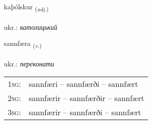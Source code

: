 \documentclass[frontgrid, backgrid]{flacards}\usepackage[]{graphicx}\usepackage[]{xcolor}
\begin{document}
\renewcommand{\blhead}{\vskip5pt {\small\bfseries\footnotesize Lýsingarorð | прикметник }}
\renewcommand{\bcfoot}{\vskip5pt \hspace{2pt}{\small\bfseries\footnotesize 3K}}


{kaþólskur \small{\textsubscript{(\textit{adj.})}} \\[1ex] %
\textphonetic{[kʰaːθoulskʏr]} \\
ukr.: \emph{католицький} \\  [2ex]
\renewcommand*{\arraystretch}{0.8}
}

\renewcommand{\flhead}{\vskip5pt \fboxsep=0pt {\small\bfseries\footnotesize Sagnorð | прислівник}}
\renewcommand{\fcfoot}{\vskip5pt \fboxsep=0pt \hspace{2pt}{\small\bfseries\footnotesize 3K}}

\renewcommand{\blhead}{\vskip5pt {\small\bfseries\footnotesize Sagnorð | прислівник }}
\renewcommand{\bcfoot}{\vskip5pt \hspace{2pt}{\small\bfseries\footnotesize 3K}}


{sannfæra \small{\textsubscript{(\textit{v.})}} \\[1ex] %
\textphonetic{[sanfaira]} \\
ukr.: \emph{переконати} \\  [2ex]
\renewcommand*{\arraystretch}{0.8}
\begin{tabular}{p{1cm}l}
\textsc{1sg}: & sannfæri -- sannfærði -- sannfært \\ 
\textsc{2sg}: & sannfærir -- sannfærðir -- sannfært \\ 
\textsc{3sg}: & sannfærir -- sannfærði -- sannfært \\ 
\end{tabular}
}
\end{document}
